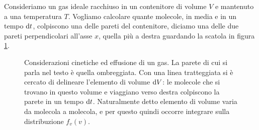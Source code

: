 Consideriamo un gas ideale racchiuso in un contenitore di volume $V$ e mantenuto a una temperatura $T$. Vogliamo calcolare quante molecole, in media e in un tempo ${\textrm d}t$, colpiscono una delle pareti del contenitore, diciamo una delle due pareti perpendicolari all'asse $x$, quella più a destra guardando la scatola in figura \ref{fig:effusione}.
\begin{figure}[h!b]
\label{fig:effusione}
\centering
{}
\caption{Considerazioni cinetiche ed effusione di un gas. La parete di cui si parla nel testo è quella ombreggiata. Con una linea tratteggiata si è cercato di delineare l'elemento di volume ${\textrm d}V$: le molecole che si trovano in questo volume e viaggiano verso destra colpiscono la parete in un tempo ${\textrm d}t$. Naturalmente detto elemento di volume varia da molecola a molecola, e per questo quindi occorre integrare sulla distribuzione $f_v(v)$.}
\end{figure}

